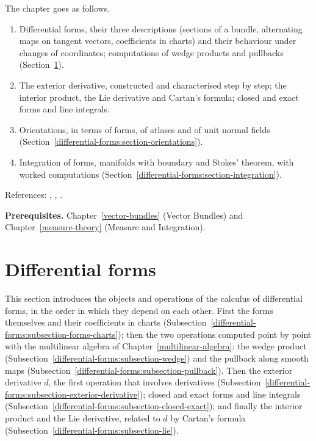The chapter goes as follows.
\begin{enumerate}
\item Differential forms, their three descriptions (sections of a bundle, alternating maps on tangent vectors, coefficients in charts) and their behaviour under changes of
coordinates; computations of wedge products and pullbacks (Section~\ref{differential-forms:section-forms}).
\item The exterior derivative, constructed and characterised step by step; the interior product, the Lie derivative and Cartan's formula; closed and exact forms and line
integrals.
\item Orientations, in terms of forms, of atlases and of unit normal fields (Section~\ref{differential-forms:section-orientations}).
\item Integration of forms, manifolds with boundary and Stokes' theorem, with worked computations (Section~\ref{differential-forms:section-integration}).
\end{enumerate}
References: \cite{lee-smooth-manifolds}, \cite{warner-foundations}, \cite{spivak-calculus-manifolds}.

\noindent\textbf{Prerequisites.} Chapter~\ref{vector-bundles} (Vector Bundles) and Chapter~\ref{measure-theory} (Measure and Integration).

\section{Differential forms}\label{differential-forms:section-forms}

This section introduces the objects and operations of the calculus of differential forms, in the order in which they depend on each other. First the forms themselves and their
coefficients in charts (Subsection~\ref{differential-forms:subsection-forms-charts}); then the two operations computed point by point with the multilinear algebra of
Chapter~\ref{multilinear-algebra}: the wedge product (Subsection~\ref{differential-forms:subsection-wedge}) and the pullback along smooth maps (Subsection~\ref{differential-forms:subsection-pullback}). Then the
exterior derivative $d$, the first operation that involves derivatives (Subsection~\ref{differential-forms:subsection-exterior-derivative}); closed and exact forms and line integrals
(Subsection~\ref{differential-forms:subsection-closed-exact}); and finally the interior product and the Lie derivative, related to $d$ by Cartan's formula
(Subsection~\ref{differential-forms:subsection-lie}).

